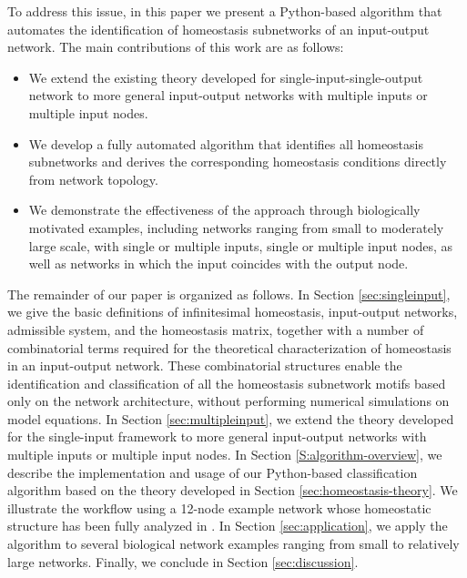 \documentclass[pdflatex,sn-basic,Numbered]{sn-jnl}
\theoremstyle{thmstyleone}%
\numberwithin{equation}{section}
\begin{document}
To address this issue, in this paper we present a Python-based algorithm that automates the identification of homeostasis subnetworks of an input-output network. The main contributions of this work are as follows:
\begin{itemize}
    \item We extend the existing theory developed for single-input-single-output network \cite{WHAG21} to more general input-output networks with multiple inputs or multiple input nodes.
    \item We develop a fully automated algorithm that identifies all homeostasis subnetworks and derives the corresponding homeostasis conditions directly from network topology.  
    \item We demonstrate the effectiveness of the approach through biologically motivated examples, including networks ranging from small to moderately large scale, with single or multiple inputs, single or multiple input nodes, as well as networks in which the input coincides with the output node. 
\end{itemize}

The remainder of our paper is organized as follows. In Section \ref{sec:singleinput}, we give the basic definitions of infinitesimal homeostasis, input-output networks, admissible system, and the homeostasis matrix, together with a number of combinatorial terms required for the theoretical characterization of homeostasis in an input-output network. These combinatorial structures enable the identification and classification of all the homeostasis subnetwork motifs based only on the network architecture, without performing numerical simulations on model equations. In Section \ref{sec:multipleinput}, we extend the theory developed for the single-input framework \cite{WHAG21} to more general input-output networks with multiple inputs or multiple input nodes. In Section \ref{S:algorithm-overview}, we describe the implementation and usage of our Python-based classification algorithm based on the theory developed in Section \ref{sec:homeostasis-theory}. We illustrate the workflow using a 12-node example network whose homeostatic structure has been fully analyzed in \cite{WHAG21}. In Section \ref{sec:application}, we apply the algorithm to several biological network examples ranging from small to relatively large networks. Finally, we conclude in Section \ref{sec:discussion}. 
\end{document}
